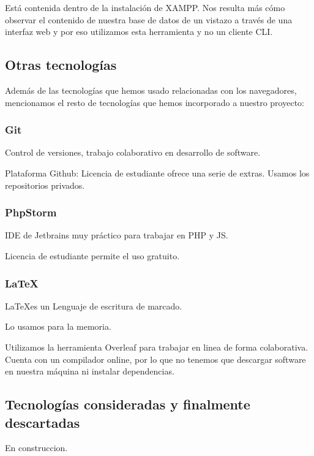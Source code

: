 Está contenida dentro de la instalación de XAMPP. Nos resulta más cómo observar el contenido de nuestra base de datos de un vistazo a través de una interfaz web y por eso utilizamos esta herramienta y no un cliente CLI. \par 

\subsection{Otras tecnologías}

Además de las tecnologías que hemos usado relacionadas con los navegadores, mencionamos el resto de tecnologías que hemos incorporado a nuestro proyecto: \par 

\subsubsection{Git}

Control de versiones, trabajo colaborativo en desarrollo de software. \par 

Plataforma Github: Licencia de estudiante ofrece una serie de extras. Usamos los repositorios privados. \par 

\subsubsection{PhpStorm}

IDE de Jetbrains muy práctico para trabajar en PHP y JS. \par 

Licencia de estudiante permite el uso gratuito. \par 

\subsubsection{\LaTeX}
\LaTeX es un Lenguaje de escritura de marcado. \par 

Lo usamos para la memoria. \par 

Utilizamos la herramienta Overleaf para trabajar en linea de forma colaborativa. Cuenta con un compilador online, por lo que no tenemos que descargar software en nuestra máquina ni instalar dependencias. \par 

\subsection{Tecnologías consideradas y finalmente descartadas}
En construccion. \par

